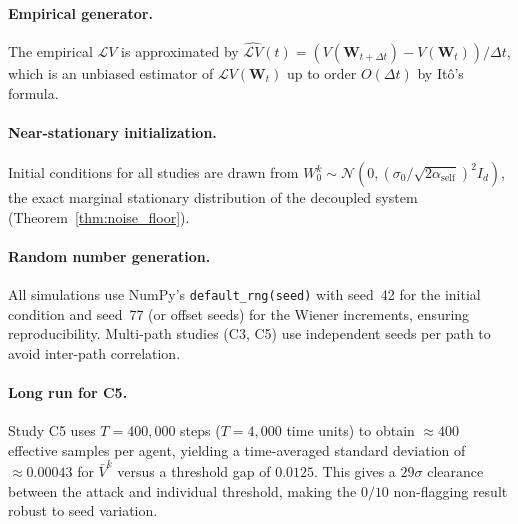 \documentclass[12pt]{article}
\theoremstyle{plain}
\theoremstyle{definition}
\newcommand{\Lgen}{\mathcal{L}}
\newcommand{\W}{\mathbf{W}}
\begin{document}
\paragraph{Empirical generator.}
The empirical $\Lgen V$ is approximated by
$\hat{\Lgen V}(t) = (V(\W_{t+\Delta t}) - V(\W_t))/\Delta t$,
which is an unbiased estimator of $\Lgen V(\W_t)$ up to order
$O(\Delta t)$ by It\^{o}'s formula.

\paragraph{Near-stationary initialization.}
Initial conditions for all studies are drawn from
$W^k_0 \sim \mathcal{N}(0, (\sigma_0/\sqrt{2\alpha_{\mathrm{self}}})^2 I_d)$,
the exact marginal stationary distribution of the decoupled system
(Theorem~\ref{thm:noise_floor}).

\paragraph{Random number generation.}
All simulations use NumPy's \texttt{default\_rng(seed)} with seed~42
for the initial condition and seed~77 (or offset seeds) for the Wiener
increments, ensuring reproducibility.  Multi-path studies (C3, C5)
use independent seeds per path to avoid inter-path correlation.

\paragraph{Long run for C5.}
Study C5 uses $T = 400{,}000$ steps ($T = 4{,}000$ time units) to
obtain $\approx 400$ effective samples per agent, yielding a
time-averaged standard deviation of $\approx 0.00043$ for $\bar V^k$
versus a threshold gap of $0.0125$.  This gives a $29\sigma$
clearance between the attack and individual threshold, making the
$0/10$ non-flagging result robust to seed variation.
\end{document}
